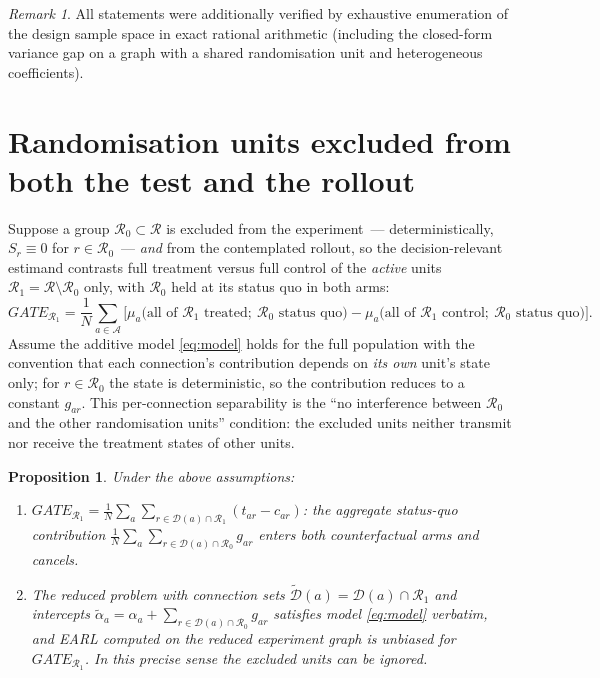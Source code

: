 \documentclass[11pt]{article}
\newtheorem{proposition}{Proposition}
\theoremstyle{remark}
\newtheorem{remark}{Remark}
\begin{document}
\begin{remark}
All statements were additionally verified by exhaustive enumeration of the design sample space in exact rational arithmetic (including the closed-form variance gap on a graph with a shared randomisation unit and heterogeneous coefficients).
\end{remark}

\section{Randomisation units excluded from both the test and the rollout}\label{sec:note2}

Suppose a group $\mathcal R_0 \subset \mathcal R$ is excluded from the experiment~--- deterministically, $S_r \equiv 0$ for $r\in\mathcal R_0$~--- \emph{and} from the contemplated rollout, so the decision-relevant estimand contrasts full treatment versus full control of the \emph{active} units $\mathcal R_1 = \mathcal R\setminus\mathcal R_0$ only, with $\mathcal R_0$ held at its status quo in both arms:
\[
GATE_{\mathcal R_1} = \frac 1N\sum_{a\in\mathcal A}\Big[
\mu_a\big(\text{all of }\mathcal R_1\text{ treated};\ \mathcal R_0\text{ status quo}\big)
- \mu_a\big(\text{all of }\mathcal R_1\text{ control};\ \mathcal R_0\text{ status quo}\big)\Big].
\]
Assume the additive model \eqref{eq:model} holds for the full population with the convention that each connection's contribution depends on \emph{its own} unit's state only; for $r \in \mathcal R_0$ the state is deterministic, so the contribution reduces to a constant $g_{ar}$. This per-connection separability is the ``no interference between $\mathcal R_0$ and the other randomisation units'' condition: the excluded units neither transmit nor receive the treatment states of other units.

\begin{proposition}\label{prop:excluded}
Under the above assumptions:
\begin{enumerate}
\item[(i)] $GATE_{\mathcal R_1} = \frac 1N\sum_a \sum_{r\in\mathcal D(a)\cap \mathcal R_1}(t_{ar}-c_{ar})$: the aggregate status-quo contribution $\frac1N\sum_a\sum_{r\in\mathcal D(a)\cap\mathcal R_0} g_{ar}$ enters both counterfactual arms and cancels.
\item[(ii)] The reduced problem with connection sets $\widetilde{\mathcal D}(a) = \mathcal D(a)\cap\mathcal R_1$ and intercepts $\tilde\alpha_a = \alpha_a + \sum_{r\in\mathcal D(a)\cap\mathcal R_0} g_{ar}$ satisfies model \eqref{eq:model} verbatim, and EARL computed on the reduced experiment graph is unbiased for $GATE_{\mathcal R_1}$. In this precise sense the excluded units can be ignored.
\end{enumerate}
\end{proposition}
\end{document}
